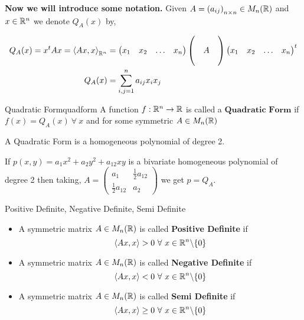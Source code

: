 \documentclass[../Analysis-3.tex]{subfiles}
\begin{document}
\textbf{Now we will introduce some notation.} Given $A = \left( a_{ij} \right)_{n\times n} \in M_n(\mathbb{R})$ and $ x \in \mathbb{R}^n $ we denote $ Q_A(x) $  by,

  \begin{align*}
    Q_A(x) = x^tAx = {\left\langle Ax,x \right\rangle}_{\mathbb{R}^n} &= \begin{pmatrix}
      x_1 & x_2 & \ldots & x_n
    \end{pmatrix} \begin{pmatrix}
       &        & \\
       & A & \\
       &        &
    \end{pmatrix} \begin{pmatrix}
      x_1 & x_2 & \ldots & x_n
    \end{pmatrix} ^t  \\
    Q_A(x) &= \sum_{i,j = 1}^{n} a_{ij} x_i x_j 
\end{align*}
  


\begin{Def}{Quadratic Form}{quadform}
  A function $f : \mathbb{R}^n \to \mathbb{R}$ is called a $\textbf{Quadratic Form}$ if $f(x) = Q_A(x) \ \forall\ x $ and for some symmetric $A \in M_n(\mathbb{R})$
\end{Def}

A Quadratic Form is a homogeneous polynomial of degree 2.

If $p(x,y) = a_1 x^2 + a_2 y^2 + a_{12} xy$
is a bivariate homogeneous polynomial of degree 2 then taking, $A = \begin{pmatrix}
    a_1                & \frac{1}{2} a_{12} \\
    \frac{1}{2} a_{12} & a_2
  \end{pmatrix}$ we get $p = Q_A$.

\begin{Def}{Positive Definite, Negative Definite, Semi Definite}{}
  \begin{itemize}
    \item A symmetric matrix $A \in M_n(\mathbb{R})$ is called \textbf{Positive Definite} if \[ \left\langle Ax, x \right\rangle > 0 \ \forall\ x \in \R^n \backslash \{0\} \]
    \item A symmetric matrix $A \in M_n(\mathbb{R})$ is called \textbf{Negative Definite} if \[ \left\langle Ax, x \right\rangle < 0 \ \forall\ x \in \R^n \backslash \{0\} \]
    \item A symmetric matrix $A \in M_n(\mathbb{R})$ is called \textbf{Semi Definite} if \[ \left\langle Ax, x \right\rangle \geq 0 \ \forall\ x \in \R^n \backslash \{0\} \]
  \end{itemize}
\end{Def}
\end{document}
